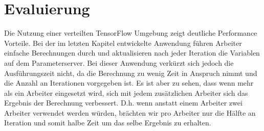 \section{Evaluierung}
Die Nutzung einer verteilten TensorFlow Umgebung zeigt deutliche Performance Vorteile. Bei der im letzten Kapitel entwickelte Anwendung führen Arbeiter einfache Berechnungen durch und aktualisieren nach jeder Iteration die Variablen auf dem Parameterserver. Bei dieser Anwendung verkürzt sich jedoch die Ausführungszeit nicht, da die Berechnung zu wenig Zeit in Anspruch nimmt und die Anzahl an Iterationen vorgegeben ist. Es ist aber zu sehen, dass wenn mehr als ein Arbeiter eingesetzt wird, sich mit jedem zusätzlichen Arbeiter sich das Ergebnis der Berechnung verbessert. D.h. wenn anstatt einem Arbeiter zwei Arbeiter verwendet werden würden, brächten wir pro Arbeiter nur die Hälfte an Iteration und somit halbe Zeit um das selbe Ergebnis zu erhalten.  